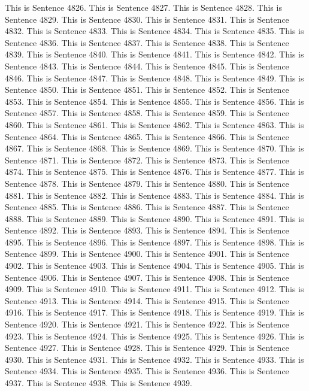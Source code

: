 \documentclass{article}
\begin{document}
This is Sentence 4826.
This is Sentence 4827.
This is Sentence 4828.
This is Sentence 4829.
This is Sentence 4830.
This is Sentence 4831.
This is Sentence 4832.
This is Sentence 4833.
This is Sentence 4834.
This is Sentence 4835.
This is Sentence 4836.
This is Sentence 4837.
This is Sentence 4838.
This is Sentence 4839.
This is Sentence 4840.
This is Sentence 4841.
This is Sentence 4842.
This is Sentence 4843.
This is Sentence 4844.
This is Sentence 4845.
This is Sentence 4846.
This is Sentence 4847.
This is Sentence 4848.
This is Sentence 4849.
This is Sentence 4850.
This is Sentence 4851.
This is Sentence 4852.
This is Sentence 4853.
This is Sentence 4854.
This is Sentence 4855.
This is Sentence 4856.
This is Sentence 4857.
This is Sentence 4858.
This is Sentence 4859.
This is Sentence 4860.
This is Sentence 4861.
This is Sentence 4862.
This is Sentence 4863.
This is Sentence 4864.
This is Sentence 4865.
This is Sentence 4866.
This is Sentence 4867.
This is Sentence 4868.
This is Sentence 4869.
This is Sentence 4870.
This is Sentence 4871.
This is Sentence 4872.
This is Sentence 4873.
This is Sentence 4874.
This is Sentence 4875.
This is Sentence 4876.
This is Sentence 4877.
This is Sentence 4878.
This is Sentence 4879.
This is Sentence 4880.
This is Sentence 4881.
This is Sentence 4882.
This is Sentence 4883.
This is Sentence 4884.
This is Sentence 4885.
This is Sentence 4886.
This is Sentence 4887.
This is Sentence 4888.
This is Sentence 4889.
This is Sentence 4890.
This is Sentence 4891.
This is Sentence 4892.
This is Sentence 4893.
This is Sentence 4894.
This is Sentence 4895.
This is Sentence 4896.
This is Sentence 4897.
This is Sentence 4898.
This is Sentence 4899.
This is Sentence 4900.
This is Sentence 4901.
This is Sentence 4902.
This is Sentence 4903.
This is Sentence 4904.
This is Sentence 4905.
This is Sentence 4906.
This is Sentence 4907.
This is Sentence 4908.
This is Sentence 4909.
This is Sentence 4910.
This is Sentence 4911.
This is Sentence 4912.
This is Sentence 4913.
This is Sentence 4914.
This is Sentence 4915.
This is Sentence 4916.
This is Sentence 4917.
This is Sentence 4918.
This is Sentence 4919.
This is Sentence 4920.
This is Sentence 4921.
This is Sentence 4922.
This is Sentence 4923.
This is Sentence 4924.
This is Sentence 4925.
This is Sentence 4926.
This is Sentence 4927.
This is Sentence 4928.
This is Sentence 4929.
This is Sentence 4930.
This is Sentence 4931.
This is Sentence 4932.
This is Sentence 4933.
This is Sentence 4934.
This is Sentence 4935.
This is Sentence 4936.
This is Sentence 4937.
This is Sentence 4938.
This is Sentence 4939.
\end{document}

